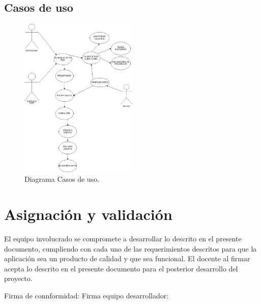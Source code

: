 \documentclass[12pt,a4paper]{article}
\begin{document}
	\subsection{Casos de uso}
	\begin{figure}[h]
		\centering
		\includegraphics[width=0.5\textwidth]{casosUso.jpg}
		\caption{Diagrama Casos de uso.}
		\label{fig: 1. Diagrama casos de uso}
	\end{figure}
	
	\newpage %
	
	\section{Asignación y validación}
	El equipo involucrado se compromete a desarrollar lo descrito en el presente documento, cumpliendo con cada uno de las requerimientos descritos para que la aplicación sea un producto de calidad y que sea funcional.\linebreak  
	El docente al firmar acepta lo descrito en el presente documento para el posterior desarrollo del proyecto.\linebreak\linebreak   
	
	Firma de connformidad: \underline{\hspace{4cm}}\linebreak\linebreak 
	Firma equipo desarrollador: \underline{\hspace{4cm}}\linebreak 
	
\end{document}
